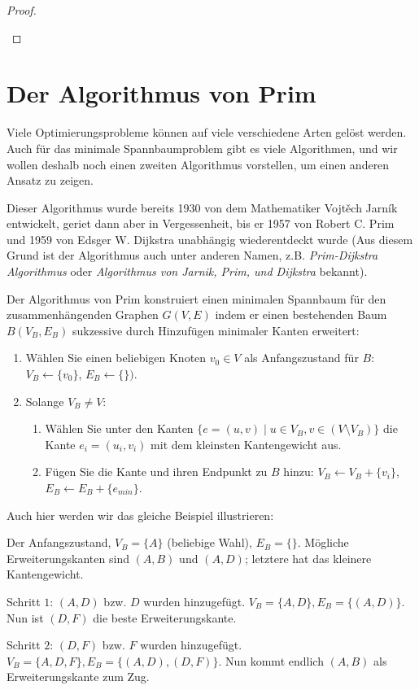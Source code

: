 \documentclass[12pt,a4paper]{report}
\theoremstyle{break}
\theoremstyle{plain}
\newtheorem{proof}{Satz}[section]
\newcommand{\algostep}[2]{\parbox{4cm}{\scalebox{0.5}{\texttt{[image: \#1]}}}
  \hfill
  \parbox{7cm}{#2}
}
\begin{document}
\begin{proof}
\begin{enumerate}
\end{enumerate}

 \end{proof}

\section{Der Algorithmus von Prim}

Viele Optimierungsprobleme k\"{o}nnen auf viele verschiedene Arten
gel\"{o}st werden. Auch f\"{u}r das minimale Spannbaumproblem gibt es
viele Algorithmen, und wir wollen deshalb noch einen zweiten
Algorithmus vorstellen, um einen anderen Ansatz zu zeigen.

Dieser Algorithmus wurde bereits 1930 von dem Mathematiker
Vojt\v{e}ch Jarn\'ik entwickelt, geriet dann aber in Vergessenheit,
bis er 1957 von Robert C. Prim und 1959 von Edsger W. Dijkstra
unabh\"{a}ngig wiederentdeckt wurde (Aus diesem Grund ist der
Algorithmus auch unter anderen Namen, z.B. \emph{Prim-Dijkstra
  Algorithmus} oder \emph{Algorithmus von Jarnik, Prim, und Dijkstra}
bekannt).

Der Algorithmus von Prim konstruiert einen minimalen Spannbaum f\"{u}r
den zusammenh\"{a}ngenden Graphen $G(V,E)$ indem er einen bestehenden Baum $B(V_B,E_B)$
sukzessive durch Hinzuf\"{u}gen minimaler Kanten erweitert:

\begin{enumerate}
\item W\"{a}hlen Sie einen beliebigen Knoten $v_0\in V$ als
  Anfangszustand f\"{u}r $B$: $V_B \gets \{v_0\}$, $E_B \gets \{\})$.
\item Solange $V_B\neq V$:
\begin{enumerate}
\item W\"{a}hlen Sie unter den Kanten $\{e = (u,v)\mid u\in V_B, v\in
  (V\!\setminus\!V_B)\}$ die Kante $e_i= (u_i,v_i)$ mit dem kleinsten
Kantengewicht aus.
\item F\"{u}gen Sie die Kante und ihren Endpunkt zu $B$ hinzu: $V_B \gets
  V_B+\{v_i\}$, $E_B \gets E_B+\{e_{min}\}$.
\end{enumerate}
\end{enumerate}

\newpage
Auch hier werden wir das gleiche Beispiel illustrieren:

\algostep{DemoPrim1.pdf}{Der Anfangszustand, $V_B = \{A\}$ (beliebige
  Wahl), $E_B = \{\}$. M\"{o}gliche Erweiterungskanten sind $(A,B)$
  und $(A,D)$; letztere hat das kleinere Kantengewicht.}
\algostep{DemoPrim2.pdf}{Schritt $1$: $(A,D)$ bzw. $D$ wurden
  hinzugef\"{u}gt. $V_B = \{A,D\}, E_B=\{(A,D)\}$. Nun ist $(D,F)$ die
  beste Erweiterungskante.}
\algostep{DemoPrim3.pdf}{Schritt $2$: $(D,F)$ bzw. $F$ wurden 
 hinzugef\"{u}gt. $V_B = \{A,D,F\}, E_B=\{(A,D), (D,F)\}$. Nun kommt
 endlich $(A,B)$ als Erweiterungskante zum Zug.}
\end{document}
